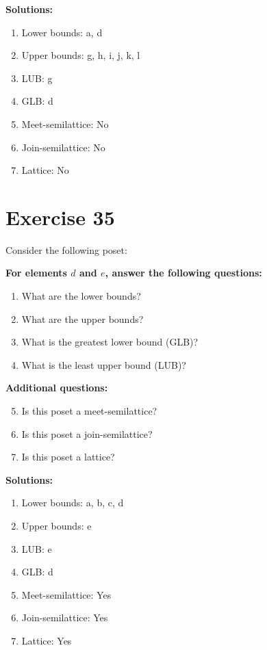 \documentclass{article}
\begin{document}
\textbf{Solutions:}
\begin{enumerate}
    \item Lower bounds: {a, d}
    \item Upper bounds: {g, h, i, j, k, l}
    \item LUB: g
    \item GLB: d
    \item Meet-semilattice: No
    \item Join-semilattice: No
    \item Lattice: No
\end{enumerate}
\newpage
\section*{Exercise 35}
Consider the following poset:
\begin{center}
\end{center}

    \textbf{For elements $d$ and $e$, answer the following questions:}
\begin{enumerate}
    \item What are the lower bounds?
    \item What are the upper bounds?
    \item What is the greatest lower bound (GLB)?
    \item What is the least upper bound (LUB)?
\end{enumerate}
    \hspace*{3ex} \textbf{Additional questions:}
\begin{enumerate}
    \setcounter{enumi}{4}
    \item Is this poset a meet-semilattice?
    \item Is this poset a join-semilattice?
    \item Is this poset a lattice?
\end{enumerate}

\textbf{Solutions:}
\begin{enumerate}
    \item Lower bounds: {a, b, c, d}
    \item Upper bounds: {e}
    \item LUB: e
    \item GLB: d
    \item Meet-semilattice: Yes
    \item Join-semilattice: Yes
    \item Lattice: Yes
\end{enumerate}
\newpage
\end{document}
